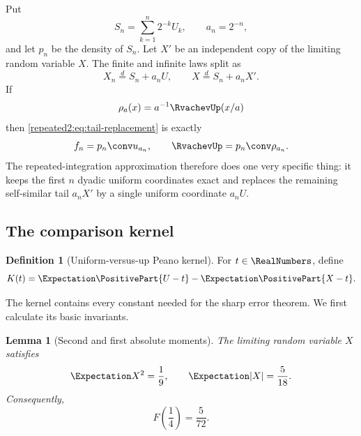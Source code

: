 \documentclass[11pt,oneside]{article}
\newtheorem{lemma}[lemma]{Lemma}
\theoremstyle{definition}
\newtheorem{definition}[definition]{Definition}
\theoremstyle{remark}
\begin{document}
Put
\begin{equation}
 S_n=\sum_{k=1}^{n}2^{-k}U_k,
 \qquad a_n=2^{-n},
 \label{repeated2:eq:Sn-an}
\end{equation}
and let $p_n$ be the density of $S_n$.  Let $X'$ be an independent copy of the limiting
random variable $X$.  The finite and infinite laws split as
\begin{equation}
 X_n\stackrel d=S_n+a_nU,
 \qquad
 X\stackrel d=S_n+a_nX'.
 \label{repeated2:eq:tail-replacement}
\end{equation}
If
\begin{equation}
 \rho_a(x)=a^{-1}\RvachevUp(x/a)
 \label{repeated2:eq:scaled-up-density}
\end{equation}
then \eqref{repeated2:eq:tail-replacement} is exactly
\begin{equation}
 f_n=p_n\conv u_{a_n},
 \qquad
 \RvachevUp=p_n\conv\rho_{a_n}.
 \label{repeated2:eq:finite-infinite-convolution-split}
\end{equation}
The repeated-integration approximation therefore does one very specific thing: it keeps the
first $n$ dyadic uniform coordinates exact and replaces the remaining self-similar tail
$a_nX'$ by a single uniform coordinate $a_nU$.

\subsection{The comparison kernel}

\begin{definition}[Uniform-versus-up Peano kernel]
\label{repeated2:def:comparison-kernel}
For $t\in\RealNumbers$, define
\begin{equation}
 K(t)=\Expectation\PositivePart{U-t}-\Expectation\PositivePart{X-t}.
 \label{repeated2:eq:K-definition}
\end{equation}
\end{definition}

The kernel contains every constant needed for the sharp error theorem.  We first calculate
its basic invariants.

\begin{lemma}[Second and first absolute moments]
\label{repeated2:lem:up-moments}
The limiting random variable $X$ satisfies
\begin{equation}
 \Expectation X^2=\frac19,
 \qquad
 \Expectation|X|=\frac5{18}.
 \label{repeated2:eq:X-moments}
\end{equation}
Consequently,
\begin{equation}
 F\left(\frac14\right)=\frac5{72}.
 \label{repeated2:eq:F-quarter}
\end{equation}
\end{lemma}
\end{document}
